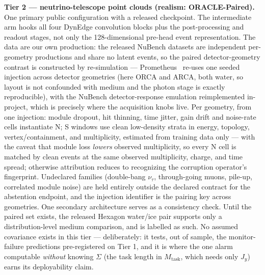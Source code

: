 \documentclass[10pt,twocolumn]{extarticle}
\begin{document}
\textbf{Tier 2 --- neutrino-telescope point clouds (realism:
ORACLE-Paired).} One primary public configuration with a released checkpoint.
The intermediate arm hooks all four DynEdge convolution blocks plus the
post-processing and readout stages, not only the 128-dimensional pre-head
event representation. The data are our own production: the released NuBench
datasets are independent per-geometry productions and share no latent events,
so the paired detector-geometry contrast is constructed by re-simulation ---
Prometheus~\cite{prometheus} re-uses one seeded injection across detector
geometries (here ORCA and ARCA, both water, so layout is not confounded with
medium and the photon stage is exactly reproducible), with the NuBench
detector-response emulation reimplemented in-project, which is precisely where
the acquisition knobs live. Per geometry, from one injection: module dropout,
hit thinning, time jitter, gain drift and noise-rate cells instantiate N; S
windows use clean low-density strata in energy, topology, vertex/containment,
and multiplicity, estimated from training data only --- with the caveat that
module loss \emph{lowers} observed multiplicity, so every N cell is matched
by clean events at the same observed multiplicity, charge, and time spread;
otherwise attribution reduces to recognizing the corruption operator's
fingerprint. Undeclared families (double-bang $\nu_\tau$, through-going
muons, pile-up, correlated module noise) are held entirely outside the
declared contract for the abstention endpoint, and the injection identifier is
the pairing key across geometries. One secondary architecture serves as a
consistency check. Until the paired set exists, the released Hexagon water/ice
pair supports only a distribution-level medium comparison, and is labelled as
such. No assumed covariance exists in this tier --- deliberately: it tests,
out of sample, the monitor-failure predictions pre-registered on Tier 1, and
it is where the one alarm computable \emph{without} knowing $\Sigma$ (the
task length in $M_{\mathrm{task}}$, which needs only $J_y$) earns its
deployability claim.
\end{document}
